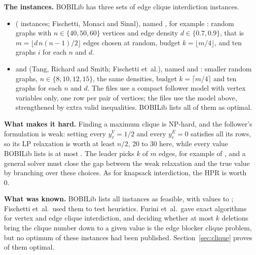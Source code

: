 \textbf{The instances.} BOBILib has three sets of edge clique interdiction instances.
\begin{itemize}\setlength{\emergencystretch}{3em}
\item {} (\NumCliqueSet{} instances; Fischetti, Monaci and Sinnl\cite{fischetti2018dynamic}),
named , for example : random graphs with
$n\in\{40,50,60\}$ vertices and edge density $d\in\{0.7,0.9\}$, that is
$m=\lfloor d\,n(n-1)/2\rfloor$ edges chosen at random, budget $k=\lfloor m/4\rfloor$, and ten
graphs $i$ for each $n$ and $d$.
\item {} and  (Tang, Richard and Smith\cite{tang2016class}; Fischetti
et~al.\cite{fischetti2018dynamic}), named  and
: smaller random graphs, $n\in\{8,10,12,15\}$, the same densities,
budget $k=\lceil m/4\rceil$ and ten graphs for each $n$ and $d$. The  files use a
compact follower model with vertex variables only, one row per pair of vertices; the
 files use the model above, strengthened by extra valid
inequalities.\cite{fischetti2018dynamic} BOBILib lists all of them as optimal.
\end{itemize}

\textbf{What makes it hard.} Finding a maximum clique is NP-hard, and the follower's formulation
is weak: setting every $y^V_v=1/2$ and every $y^E_e=0$ satisfies all its rows, so its LP
relaxation is worth at least $n/2$, 20 to 30 here, while every value BOBILib lists is at most
\CliqueBobiMax. The leader picks $k$ of $m$ edges, for example \CliqueKSixtySeven{} of
\CliqueMSixtySeven{}, and a general solver must close the gap between the weak relaxation and the
true value by branching over these choices. As for knapsack interdiction, the HPR is worth 0.

\textbf{What was known.} BOBILib lists all \NumCliqueSet{}  instances as feasible, with
values \CliqueBobiMin{} to \CliqueBobiMax; Fischetti et~al.\ used them to test heuristics. Furini
et~al.\ gave exact algorithms for vertex and edge clique
interdiction,\cite{furini2019maximum,furini2021branch} and deciding whether at most $k$ deletions
bring the clique number down to a given value is the edge blocker clique
problem,\cite{mahdavipajouh2020minimum} but no optimum of these \NumCliqueSet{} instances had been
published. Section~\ref{sec:clique} proves \NumNewClique{} of them optimal.

